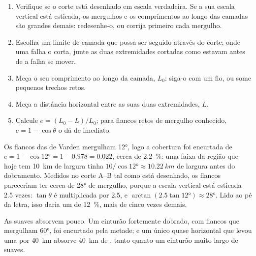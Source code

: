 \begin{method}\label{met:g12:mountain-building:shortening}
\begin{enumerate}
  \item Verifique se o corte está desenhado em escala verdadeira. Se a sua
        escala vertical está esticada, os mergulhos e os comprimentos ao
        longo das camadas são grandes demais: redesenhe-o, ou corrija
        primeiro cada mergulho.
  \item Escolha um limite de camada que possa ser seguido através do corte;
        onde uma falha o corta, junte as duas extremidades cortadas como
        estavam antes de a falha se mover.
  \item Meça o seu comprimento ao longo da camada, $L_0$: siga-o com um fio,
        ou some pequenos trechos retos.
  \item Meça a distância horizontal entre as suas duas extremidades, $L$.
  \item Calcule $e = (L_0 - L)/L_0$; para flancos retos de mergulho
        conhecido, $e = 1 - \cos\theta$ o dá de imediato.
\end{enumerate}
\end{method}

\begin{example}\label{ex:g12:mountain-building:varden}
Os flancos das  de Varden mergulham \ang{12}, logo a cobertura foi
encurtada de $e = 1 - \cos\ang{12} = 1 - 0.978 = 0.022$, cerca de
\qty{2.2}{\percent}: uma faixa da região que hoje tem \qty{10}{km} de largura
tinha $10/\cos\ang{12} \approx
\qty{10.22}{km}$ de largura antes do dobramento. Medidos no corte A--B tal como está desenhado, os flancos
pareceriam ter cerca de \ang{28} de mergulho, porque a escala vertical está
esticada 2.5 vezes: $\tan\theta$ é multiplicada por 2.5, e $\arctan(2.5
\tan\ang{12}) \approx \ang{28}$. Lido ao pé da letra, isso daria um
 de \qty{12}{\percent}, mais de cinco vezes demais.
\end{example}

As  suaves absorvem pouco. Um cinturão fortemente dobrado, com flancos
que mergulham \ang{60}, foi encurtado pela metade; e um único 
quase horizontal que levou uma  por \qty{40}{km} absorve \qty{40}{km}
de , tanto quanto um cinturão muito largo de  suaves.

